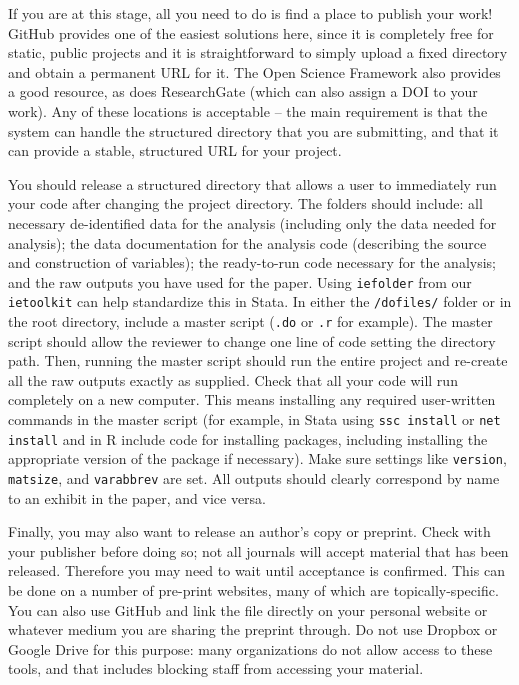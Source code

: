 If you are at this stage,
all you need to do is find a place to publish your work!
GitHub provides one of the easiest solutions here,
since it is completely free for static, public projects
and it is straightforward to simply upload a fixed directory
and obtain a permanent URL for it.
The Open Science Framework also provides a good resource,
as does ResearchGate (which can also assign a DOI to your work).
Any of these locations is acceptable --
the main requirement is that the system can handle
the structured directory that you are submitting,
and that it can provide a stable, structured URL for your project.

You should release a structured directory that allows a user
to immediately run your code after changing the project directory.
The folders should include:
all necessary de-identified data for the analysis
(including only the data needed for analysis);
the data documentation for the analysis code
(describing the source and construction of variables);
the ready-to-run code necessary for the analysis; and
the raw outputs you have used for the paper.
Using \texttt{iefolder} from our \texttt{ietoolkit} can help standardize this in Stata.
In either the \texttt{/dofiles/} folder or in the root directory,
include a master script (\texttt{.do} or \texttt{.r} for example).
The master script should allow the reviewer to change
one line of code setting the directory path.
Then, running the master script should run the entire project
and re-create all the raw outputs exactly as supplied.
Check that all your code will run completely on a new computer.
This means installing any required user-written commands in the master script
(for example, in Stata using \texttt{ssc install} or \texttt{net install}
and in R include code for installing packages,
including installing the appropriate version of the package if necessary).
Make sure settings like \texttt{version}, \texttt{matsize}, and \texttt{varabbrev} are set.
All outputs should clearly correspond by name to an exhibit in the paper, and vice versa.

Finally, you may also want to release an author's copy or preprint.
Check with your publisher before doing so;
not all journals will accept material that has been released.
Therefore you may need to wait until acceptance is confirmed.
This can be done on a number of pre-print websites,
many of which are topically-specific.
You can also use GitHub and link the file directly
on your personal website or whatever medium you are
sharing the preprint through.
Do not use Dropbox or Google Drive for this purpose:
many organizations do not allow access to these tools,
and that includes blocking staff from accessing your material.
